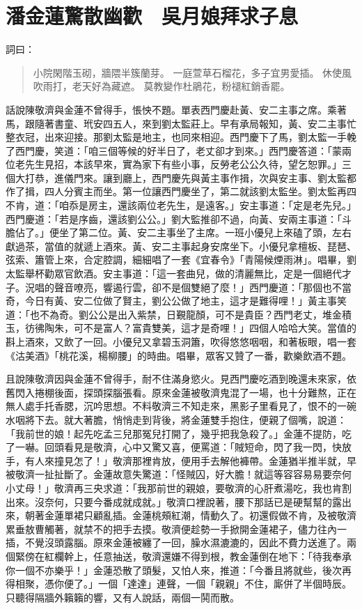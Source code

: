 
\chapter{潘金蓮驚散幽歡　吳月娘拜求子息}

詞曰：
\begin{quote}
小院閑階玉砌，牆隈半簇蘭芽。
一庭萱草石榴花，多子宜男愛插。
休使風吹雨打，老天好為藏遮。
莫教變作杜鵑花，粉褪紅銷香罷。
\end{quote}

話說陳敬濟與金蓮不曾得手，悵怏不題。單表西門慶赴黃、安二主事之席。乘著馬，跟隨著書童、玳安四五人，來到劉太監莊上。早有承局報知，黃、安二主事忙整衣冠，出來迎接。那劉太監是地主，也同來相迎。西門慶下了馬，劉太監一手輓了西門慶，笑道：「咱三個等候的好半日了，老丈卻才到來。」西門慶答道：「蒙兩位老先生見招，本該早來，實為家下有些小事，反勞老公公久待，望乞恕罪。」三個大打恭，進儀門來。讓到廳上，西門慶先與黃主事作揖，次與安主事、劉太監都作了揖，四人分賓主而坐。第一位讓西門慶坐了，第二就該劉太監坐。劉太監再四不肯，道：「咱忝是房主，還該兩位老先生，是遠客。」安主事道：「定是老先兒。」西門慶道：「若是序齒，還該劉公公。」劉大監推卻不過，向黃、安兩主事道：「斗膽佔了。」便坐了第二位。黃、安二主事坐了主席。一班小優兒上來磕了頭，左右獻過茶，當值的就遞上酒來。黃、安二主事起身安席坐下。小優兒拿檀板、琵琶、弦索、簫管上來，合定腔調，細細唱了一套《宜春令》「青陽候煙雨淋」。唱畢，劉太監舉杯勸眾官飲酒。安主事道：「這一套曲兒，做的清麗無比，定是一個絕代才子。況唱的聲音嘹亮，響遏行雲，卻不是個雙絕了麼！」西門慶道：「那個也不當奇，今日有黃、安二位做了賢主，劉公公做了地主，這才是難得哩！」黃主事笑道：「也不為奇。劉公公是出入紫禁，日覲龍顏，可不是貴臣？西門老丈，堆金積玉，彷彿陶朱，可不是富人？富貴雙美，這才是奇哩！」四個人哈哈大笑。當值的斟上酒來，又飲了一回。小優兒又拿碧玉洞簫，吹得悠悠咽咽，和著板眼，唱一套《沽美酒》「桃花溪，楊柳腰」的時曲。唱畢，眾客又贊了一番，歡樂飲酒不題。

且說陳敬濟因與金蓮不曾得手，耐不住滿身慾火。見西門慶吃酒到晚還未來家，依舊閃入捲棚後面，探頭探腦張看。原來金蓮被敬濟鬼混了一場，也十分難熬，正在無人處手托香腮，沉吟思想。不料敬濟三不知走來，黑影子里看見了，恨不的一碗水咽將下去。就大著膽，悄悄走到背後，將金蓮雙手抱住，便親了個嘴，說道：「我前世的娘！起先吃孟三兒那冤兒打開了，幾乎把我急殺了。」金蓮不提防，吃了一嚇。回頭看見是敬濟，心中又驚又喜，便罵道：「賊短命，閃了我一閃，快放手，有人來撞見怎了！」敬濟那裡肯放，便用手去解他褲帶。金蓮猶半推半就，早被敬濟一扯扯斷了。金蓮故意失驚道：「怪賊囚，好大膽！就這等容容易易要奈何小丈母！」敬濟再三央求道：「我那前世的親娘，要敬濟的心肝煮湯吃，我也肯割出來。沒奈何，只要今番成就成就。」敬濟口裡說著，腰下那話已是硬幫幫的露出來，朝著金蓮單裙只顧亂插。金蓮桃頰紅潮，情動久了。初還假做不肯，及被敬濟累垂敖曹觸著，就禁不的把手去摸。敬濟便趁勢一手掀開金蓮裙子，儘力往內一插，不覺沒頭露腦。原來金蓮被纏了一回，臊水濕漉漉的，因此不費力送進了。兩個緊傍在紅欄幹上，任意抽送，敬濟還嫌不得到根，教金蓮倒在地下：「待我奉承你一個不亦樂乎！」金蓮恐散了頭髮，又怕人來，推道：「今番且將就些，後次再得相聚，憑你便了。」一個「達達」連聲，一個「親親」不住，廝併了半個時辰。只聽得隔牆外籟籟的響，又有人說話，兩個一鬨而散。

